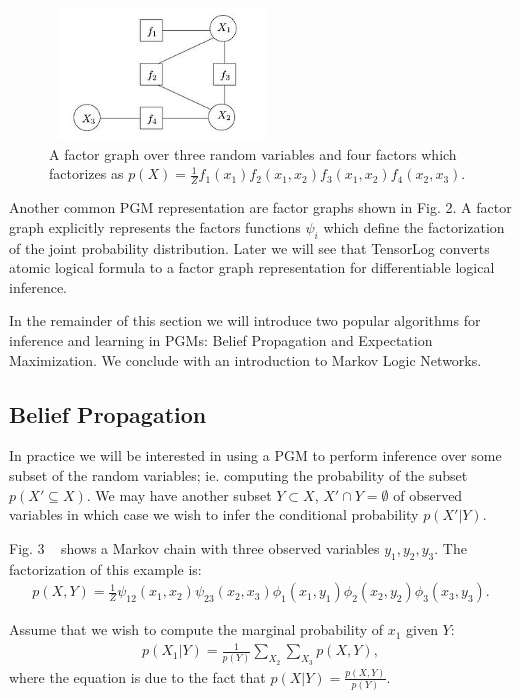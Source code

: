 \documentclass[11pt]{article}
\begin{document}
\begin{figure}
	\begin{center}
		\includegraphics[width=6cm, height=3.5cm]{factor_graph}
	\end{center}
	\caption{A factor graph over three random variables and four factors which factorizes as $p(X) = \frac{1}{Z}f_1(x_1)f_2(x_1, x_2)f_3(x_1, x_2)f_4(x_2, x_3)$.}
\end{figure}

Another common PGM representation are factor graphs shown in Fig. 2.  A factor graph explicitly represents the factors functions $\psi_i$ which define the factorization of the joint probability distribution.  Later we will see that TensorLog converts atomic logical formula to a factor graph representation for differentiable logical inference.

In the remainder of this section we will introduce two popular algorithms for inference and learning in PGMs: Belief Propagation and Expectation Maximization.  We conclude with an introduction to Markov Logic Networks. 
\subsection{Belief Propagation}
In practice we will be interested in using a PGM to perform inference over some subset of the random variables; ie. computing the probability of the subset $p(X' \subseteq X)$.  We may have another subset $Y \subset X$, $X' \cap Y = \emptyset$ of observed variables in which case we wish to infer the conditional probability $p(X' | Y)$.

Fig. 3 ~\cite{Freeman13} shows a Markov chain with three observed variables $y_1, y_2, y_3$.  The factorization of this example is: 
\begin{gather}
p(X, Y) = \frac{1}{Z} \psi_{12}(x_1, x_2) \psi_{23}(x_2, x_3) \phi_1(x_1, y_1) \phi_2(x_2, y_2) \phi_3(x_3, y_3).
\end{gather}

Assume that we wish to compute the marginal probability of $x_1$ given $Y$: 
\begin{gather}
p(X_1 | Y) = \frac{1}{p(Y)} \sum_{X_2} \sum_{X_3} p(X, Y),
\end{gather}
where the equation is due to the fact that $p(X|Y) = \frac{p(X,Y)}{p(Y)}$.
\end{document}
